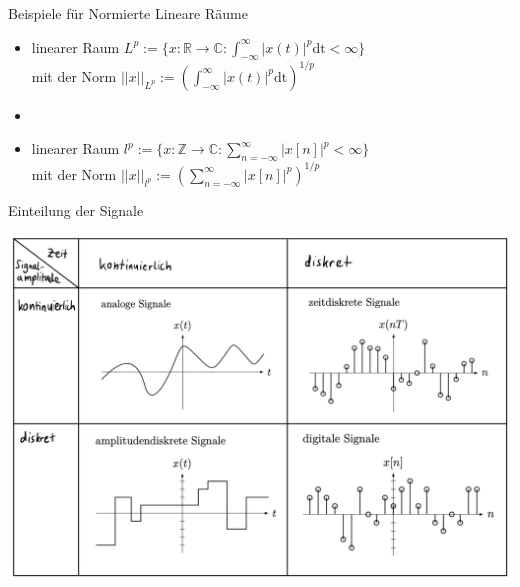 \documentclass[14pt, aspectratio=169, handout]{beamer}
\begin{document}
\begin{frame}{Beispiele für Normierte Lineare Räume}
    \begin{itemize}
        \item linearer Raum $L^p := \{ x:\mathbb{R}\to \mathbb{C} : \int_{-\infty}^\infty |x(t)|^p \text{dt} < \infty \} $ \\mit der Norm $||x||_{L^p} := \left( \int_{-\infty}^\infty |x(t)|^p \text{dt}\right)^{1/p}$
        \item[] 
        \item linearer Raum $l^p :=\{ x:\mathbb{Z}\to \mathbb{C} : \sum_{n=-\infty}^\infty |x[n]|^p < \infty \} $ \\mit der Norm $||x||_{l^p} := \left( \sum_{n=-\infty}^\infty |x[n]|^p \right)^{1/p}$
    \end{itemize}
\end{frame}

\begin{frame}{Einteilung der Signale}
    \begin{center}
            \includegraphics[width=0.7\linewidth]{figures/Signale.jpg}
    \end{center}
\end{frame}
\end{document}
